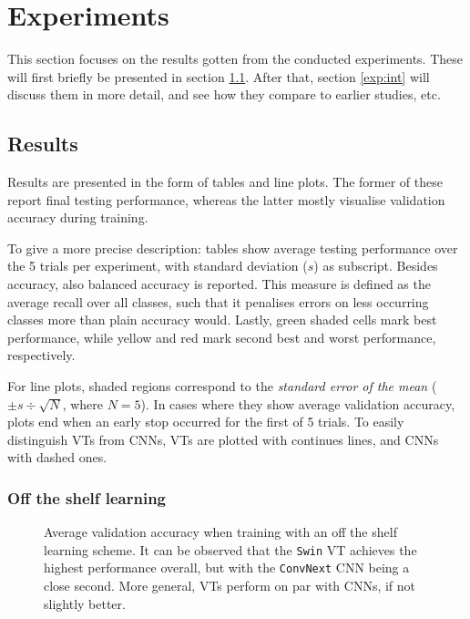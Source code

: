 \section{Experiments}
This section focuses on the results gotten from the conducted experiments. These will first briefly be presented in section \ref{results}. After that, section \ref{exp:int} will discuss them in more detail, and see how they compare to earlier studies, etc.

\subsection{Results} \label{results}
Results are presented in the form of tables and line plots. The former of these report final testing performance, whereas the latter mostly visualise validation accuracy during training.

To give a more precise description: tables show average testing performance over the 5 trials per experiment, with standard deviation ($s$) as subscript. Besides accuracy, also balanced accuracy is reported. This measure is defined as the average recall over all classes, such that it penalises errors on less occurring classes more than plain accuracy would. Lastly, green shaded cells mark best performance, while yellow and red mark second best and worst performance, respectively.

For line plots, shaded regions correspond to the \textit{standard error of the mean} ($\pm s \div \sqrt{N}$, where $N=5$). In cases where they show average validation accuracy, plots end when an early stop occurred for the first of 5 trials. To easily distinguish VTs from CNNs, VTs are plotted with continues lines, and CNNs with dashed ones.

\subsubsection{Off the shelf learning} \label{results:ots}

\begin{figure}[tb]
    \centering
    \def\svgwidth{\textwidth}
    
    \caption{Average validation accuracy when training with an off the shelf learning scheme. It can be observed that the \texttt{Swin} VT achieves the highest performance overall, but with the \texttt{ConvNext} CNN being a close second. More general, VTs perform on par with CNNs, if not slightly better.}
    \label{results:img:ots}
\end{figure}

